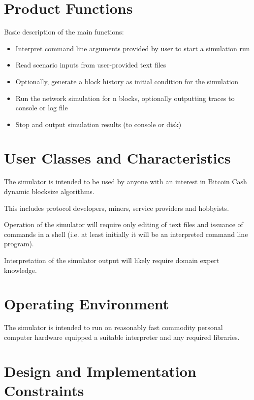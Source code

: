 \documentclass{scrreprt}
\begin{document}
  \section{Product Functions}

    Basic description of the main functions:
    \begin{itemize}
      \item Interpret command line arguments provided by user to start a
        simulation run
      \item Read scenario inputs from user-provided text files
      \item Optionally, generate a block history as initial condition for the
        simulation
      \item Run the network simulation for n blocks, optionally outputting
        traces to console or log file
      \item Stop and output simulation results (to console or disk)
    \end{itemize}

  \section{User Classes and Characteristics}

    The simulator is intended to be used by anyone with an interest in Bitcoin
    Cash dynamic blocksize algorithms.

    This includes protocol developers, miners, service providers and hobbyists.

    Operation of the simulator will require only editing of text files and
    issuance of commands in a shell (i.e. at least initially it will be an
    interpreted command line program).

    Interpretation of the simulator output will likely require domain expert
    knowledge.

  \section{Operating Environment}

    The simulator is intended to run on reasonably fast commodity personal
    computer hardware equipped a suitable interpreter and any required
    libraries.

  \section{Design and Implementation Constraints}
\end{document}
